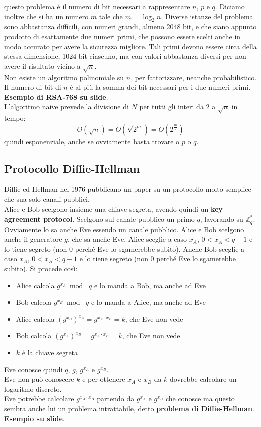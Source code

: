 \documentclass[a4paper,12pt, oneside]{book}
\begin{document}
questo problema è il numero di bit necessari a rappresentare $n$, $p$ e
$q$. Diciamo inoltre che si ha un numero $m$ tale che $m=\log_2n$. Diverse
istanze del problema sono abbastanza difficili, con numeri grandi, almeno 2048
bit, e che siano appunto prodotto di esattamente due numeri primi, che possono
essere scelti anche in modo accurato per avere la sicurezza migliore. Tali primi
devono essere circa della stessa dimensione, 1024 bit ciascuno, ma con valori
abbastanza diversi per non avere il risultato vicino a $\sqrt{n}$. \\
Non esiste un algoritmo polinomiale su $n$, per fattorizzare, neanche
probabilistico. Il numero di bit di $n$ è al più la somma dei bit necessari per
i due numeri primi.\\
\textbf{Esempio di RSA-768 su slide}.\\
L'algoritmo naive prevede la divisione di $N$ per tutti gli interi da 2 a
$\sqrt{n}$ in tempo:
\[O(\sqrt{n})=O(\sqrt{2^m})=O(2^{\frac{m}{2}})\]
quindi esponenziale, anche se ovviamente basta trovare o $p$ o $q$.\\
\subsection{Protocollo Diffie-Hellman}
Diffie ed Hellman nel 1976 pubblicano un paper su un protocollo molto semplice
che sua solo canali pubblici.\\
Alice e Bob scelgono insieme una chiave segreta, avendo quindi un \textbf{key
  agreement protocol}. Scelgono sul canale pubblico un primo $q$, lavorando su
$\mathbb{Z}_q^*$. Ovviamente lo sa anche Eve essendo un canale pubblico. Alice e
Bob scelgono anche il generatore $g$, che sa anche Eve. Alice sceglie a caso
$x_A$, $0<x_A<q-1$ e lo tiene segreto (non 0 perché Eve lo sgamerebbe
subito). Anche Bob sceglie a caso $x_A$, $0<x_B<q-1$ e lo tiene segreto (non 0
perché Eve lo sgamerebbe subito). Si procede così:
\begin{itemize}
  \item Alice calcola $g^{x_A}\bmod\,\,q$ e lo manda a Bob, ma anche ad Eve
  \item Bob calcola $g^{x_B}\bmod\,\,q$ e lo manda a Alice, ma anche ad Eve
  \item Alice calcola $(g^{x_B})^{x_A}=g^{x_A\cdot x_B}=k$, che Eve non vede
  \item Bob calcola $(g^{x_A})^{x_B}=g^{x_A\cdot x_B}=k$, che Eve non vede
  \item $k$ è la chiave segreta
\end{itemize}
Eve conosce quindi $q$, $g$, $g^{x_A}$ e $g^{x_B}$.\\
Eve non può conoscere $k$ e per ottenere $x_A$ e $x_B$ da $k$ dovrebbe calcolare
un logaritmo discreto.\\
Eve potrebbe calcolare $g^{x_A\cdot x_B}$ partendo da $g^{x_A}$ e $g^{x_B}$ che
conosce ma questo sembra anche lui un problema intrattabile, detto
\textbf{problema di Diffie-Hellman}.\\
\textbf{Esempio su slide}.
\end{document}
